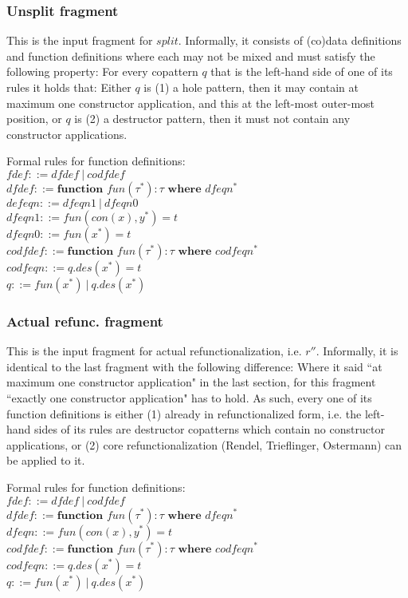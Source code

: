 \documentclass[11pt]{article} %
\begin{document}
\subsubsection{Unsplit fragment}

This is the input fragment for $split$. Informally, it consists of (co)data definitions and function definitions where each may not be mixed and must satisfy the following property: For every copattern $q$ that is the left-hand side of one of its rules it holds that: Either $q$ is (1) a hole pattern, then it may contain at maximum one constructor application, and this at the left-most outer-most position, or $q$ is (2) a destructor pattern, then it must not contain any constructor applications.

Formal rules for function definitions:\\
$fdef ::= dfdef ~ | ~ codfdef$\\
$dfdef ::= \textbf{function } fun(\tau^*): \tau \textbf{ where } dfeqn^*$\\
$defeqn ::= dfeqn1 ~ | ~ dfeqn0$\\
$dfeqn1 ::= fun(con(x), y^*) = t$\\
$dfeqn0 ::= fun(x^*) = t$\\
$codfdef ::= \textbf{function } fun(\tau^*): \tau \textbf{ where } codfeqn^*$\\
$codfeqn ::= q.des(x^*) = t$\\
$q ::= fun(x^*) ~ | ~ q.des(x^*)$

\subsubsection{Actual refunc. fragment}

This is the input fragment for actual refunctionalization, i.e. $r''$. Informally, it is identical to the last fragment with the following difference: Where it said ``at maximum one constructor application" in the last section, for this fragment ``exactly one constructor application" has to hold. As such, every one of its function definitions is either (1) already in refunctionalized form, i.e. the left-hand sides of its rules are destructor copatterns which contain no constructor applications, or (2) core refunctionalization (Rendel, Trieflinger, Ostermann) can be applied to it.

Formal rules for function definitions:\\
$fdef ::= dfdef ~ | ~ codfdef$\\
$dfdef ::= \textbf{function } fun(\tau^*): \tau \textbf{ where } dfeqn^*$\\
$dfeqn ::= fun(con(x), y^*) = t$\\
$codfdef ::= \textbf{function } fun(\tau^*): \tau \textbf{ where } codfeqn^*$\\
$codfeqn ::= q.des(x^*) = t$\\
$q ::= fun(x^*) ~ | ~ q.des(x^*)$
\end{document}
